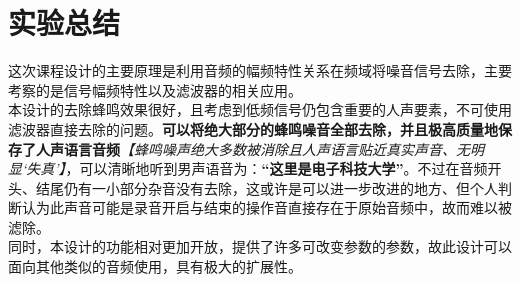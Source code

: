\section{实验总结}
这次课程设计的主要原理是利用音频的幅频特性关系在频域将噪音信号去除，主要考察的是信号幅频特性以及滤波器的相关应用。\\
\indent 本设计的去除蜂鸣效果很好，且考虑到低频信号仍包含重要的人声要素，不可使用滤波器直接去除的问题。\textbf{可以将绝大部分的蜂鸣噪音全部去除，并且极高质量地保存了人声语言音频}\textit{【蜂鸣噪声绝大多数被消除且人声语言贴近真实声音、无明显‘失真’】}，可以清晰地听到男声语音为：\textbf{“这里是电子科技大学”}。不过在音频开头、结尾仍有一小部分杂音没有去除，这或许是可以进一步改进的地方、但个人判断认为此声音可能是录音开启与结束的操作音直接存在于原始音频中，故而难以被滤除。\\
\indent 同时，本设计的功能相对更加开放，提供了许多可改变参数的参数，故此设计可以面向其他类似的音频使用，具有极大的扩展性。